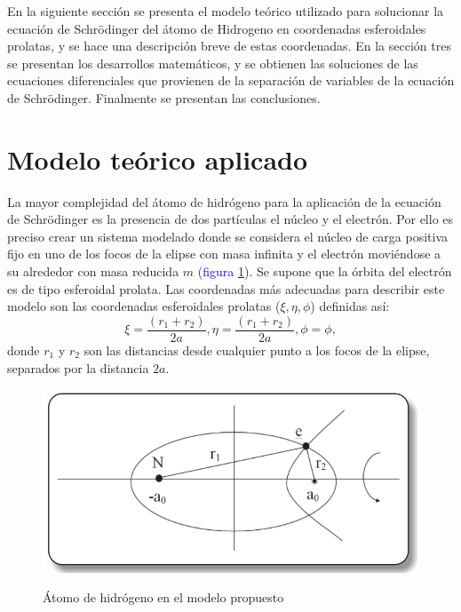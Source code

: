 \documentclass[12pt]{article}
\begin{document}
        En la siguiente sección se presenta el modelo 
        teórico utilizado para solucionar la ecuación 
        de Schr\"odinger del átomo de Hidrogeno en 
        coordenadas esferoidales prolatas, y se hace 
        una descripción breve de estas coordenadas. 
        En la sección tres se presentan los desarrollos 
        matemáticos, y se obtienen las soluciones de 
        las ecuaciones diferenciales que provienen 
        de la separación de variables de la ecuación 
        de Schr\"odinger. Finalmente se presentan las conclusiones.

        \section{Modelo teórico aplicado}
        La mayor complejidad del átomo de 
        hidrógeno para la aplicación de la ecuación de 
        Schr\"odinger es la presencia de dos partículas 
        el núcleo y el electrón. Por ello es preciso 
        crear un sistema modelado donde se considera 
        el núcleo de carga positiva fijo en uno de
        los focos de la elipse con masa infinita y el 
        electrón moviéndose a su alrededor con masa 
        reducida $m$ (\textcolor{blue}{figura \ref{Figura 1}}). Se supone que la órbita 
        del electrón es de tipo esferoidal prolata. Las 
        coordenadas más adecuadas para describir 
        este modelo son las coordenadas esferoidales 
        prolatas ($\xi, \eta, \phi$) definidas así:
        \begin{equation}\label{Equation 1}
            \xi = \dfrac{(r_{1} + r_{2})}{2a}, \eta = \dfrac{(r_{1} + r_{2})}{2a}, \phi = \phi,
        \end{equation}
        donde $r_{1}$ y $r_{2}$ son las distancias desde 
        cualquier punto a los focos de la elipse, 
        separados por la distancia $2a$. 
        \begin{figure}[H] 
            \centering
            \caption{Átomo de hidrógeno en el modelo propuesto}
            \includegraphics[scale=0.4]{Figuras/Figura1.PNG}
            \label{Figura 1}
        \end{figure}
\end{document}
